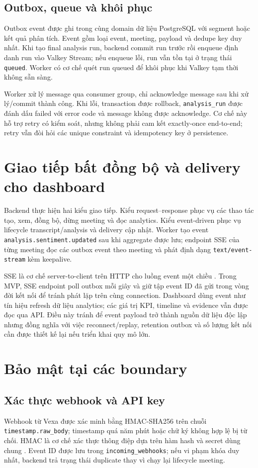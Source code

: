 \subsection{Outbox, queue và khôi phục}
Outbox event được ghi trong cùng domain dữ liệu PostgreSQL với segment hoặc kết quả phân tích. Event gồm loại event, meeting, payload và dedupe key duy nhất. Khi tạo final analysis run, backend commit run trước rồi enqueue định danh run vào Valkey Stream; nếu enqueue lỗi, run vẫn tồn tại ở trạng thái \texttt{queued}. Worker có cơ chế quét run queued để khôi phục khi Valkey tạm thời không sẵn sàng.

Worker xử lý message qua consumer group, chỉ acknowledge message sau khi xử lý/commit thành công. Khi lỗi, transaction được rollback, \texttt{analysis\_run} được đánh dấu failed với error code và message không được acknowledge. Cơ chế này hỗ trợ retry có kiểm soát, nhưng không phải cam kết exactly-once end-to-end; retry vẫn đòi hỏi các unique constraint và idempotency key ở persistence.

\section{Giao tiếp bất đồng bộ và delivery cho dashboard}
Backend thực hiện hai kiểu giao tiếp. Kiểu request--response phục vụ các thao tác tạo, xem, đồng bộ, dừng meeting và đọc analytics. Kiểu event-driven phục vụ lifecycle transcript/analysis và delivery cập nhật. Worker tạo event \texttt{analysis.sentiment.\allowbreak updated} sau khi aggregate được lưu; endpoint SSE của từng meeting đọc các outbox event theo meeting và phát định dạng \texttt{text/event-stream} kèm keepalive.

SSE là cơ chế server-to-client trên HTTP cho luồng event một chiều \cite{sse2015}. Trong MVP, SSE endpoint poll outbox mỗi giây và giữ tập event ID đã gửi trong vòng đời kết nối để tránh phát lặp trên cùng connection. Dashboard dùng event như tín hiệu refresh dữ liệu analytics; các giá trị KPI, timeline và evidence vẫn được đọc qua API. Điều này tránh để event payload trở thành nguồn dữ liệu độc lập nhưng đồng nghĩa với việc reconnect/replay, retention outbox và số lượng kết nối cần được thiết kế lại nếu triển khai quy mô lớn.

\section{Bảo mật tại các boundary}
\subsection{Xác thực webhook và API key}
Webhook từ Vexa được xác minh bằng HMAC-SHA256 trên chuỗi \texttt{timestamp.raw\_body}; timestamp quá năm phút hoặc chữ ký không hợp lệ bị từ chối. HMAC là cơ chế xác thực thông điệp dựa trên hàm hash và secret dùng chung \cite{krawczyk1997}. Event ID được lưu trong \texttt{incoming\_webhooks}; nếu vi phạm khóa duy nhất, backend trả trạng thái duplicate thay vì chạy lại lifecycle meeting.

